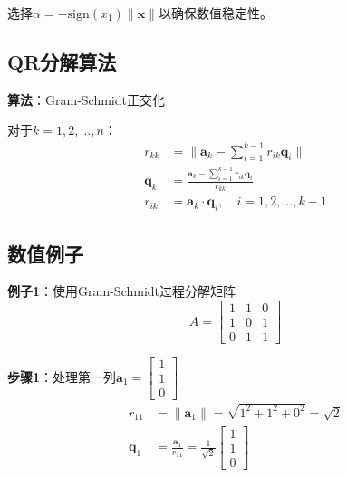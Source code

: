 \documentclass[12pt,a4paper]{article}
\begin{document}
选择$\alpha = -\text{sign}(x_1)\|\bm{x}\|$以确保数值稳定性。

\subsection{QR分解算法}

\textbf{算法}：Gram-Schmidt正交化

对于$k = 1, 2, \ldots, n$：
\begin{align}
r_{kk} &= \|\bm{a}_k - \sum_{i=1}^{k-1} r_{ik} \bm{q}_i\| \\
\bm{q}_k &= \frac{\bm{a}_k - \sum_{i=1}^{k-1} r_{ik} \bm{q}_i}{r_{kk}} \\
r_{ik} &= \bm{a}_k \cdot \bm{q}_i, \quad i = 1, 2, \ldots, k-1
\end{align}

\subsection{数值例子}

\textbf{例子1}：使用Gram-Schmidt过程分解矩阵
\begin{equation}
A = \begin{bmatrix} 1 & 1 & 0 \\ 1 & 0 & 1 \\ 0 & 1 & 1 \end{bmatrix}
\end{equation}

\textbf{步骤1}：处理第一列$\bm{a}_1 = \begin{bmatrix} 1 \\ 1 \\ 0 \end{bmatrix}$
\begin{align}
r_{11} &= \|\bm{a}_1\| = \sqrt{1^2 + 1^2 + 0^2} = \sqrt{2} \\
\bm{q}_1 &= \frac{\bm{a}_1}{r_{11}} = \frac{1}{\sqrt{2}} \begin{bmatrix} 1 \\ 1 \\ 0 \end{bmatrix}
\end{align}
\end{document}
